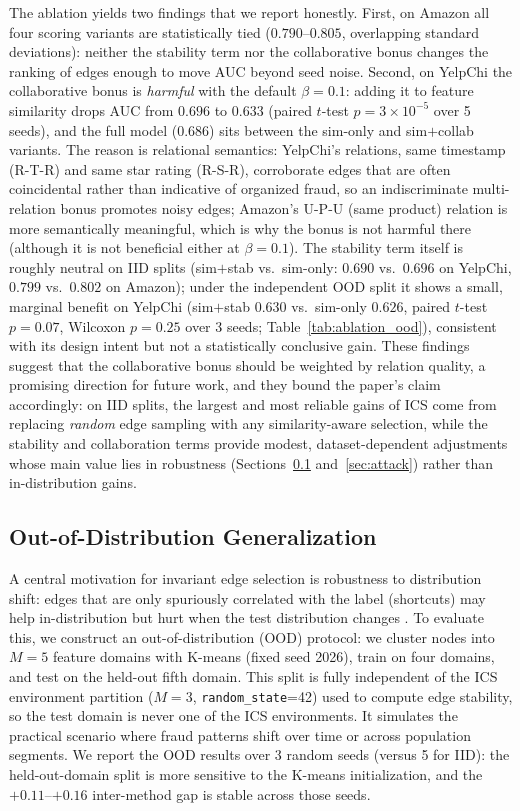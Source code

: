 \documentclass[11pt]{article}
\begin{document}
The ablation yields two findings that we report honestly. First, on Amazon all four scoring variants are statistically tied ($0.790$--$0.805$, overlapping standard deviations): neither the stability term nor the collaborative bonus changes the ranking of edges enough to move AUC beyond seed noise. Second, on YelpChi the collaborative bonus is \emph{harmful} with the default $\beta=0.1$: adding it to feature similarity drops AUC from $0.696$ to $0.633$ (paired $t$-test $p=3\times10^{-5}$ over 5 seeds), and the full model ($0.686$) sits between the sim-only and sim$+$collab variants. The reason is relational semantics: YelpChi's relations, same timestamp (R-T-R) and same star rating (R-S-R), corroborate edges that are often coincidental rather than indicative of organized fraud, so an indiscriminate multi-relation bonus promotes noisy edges; Amazon's U-P-U (same product) relation is more semantically meaningful, which is why the bonus is not harmful there (although it is not beneficial either at $\beta=0.1$). The stability term itself is roughly neutral on IID splits (sim$+$stab vs.\ sim-only: $0.690$ vs.\ $0.696$ on YelpChi, $0.799$ vs.\ $0.802$ on Amazon); under the independent OOD split it shows a small, marginal benefit on YelpChi (sim$+$stab $0.630$ vs.\ sim-only $0.626$, paired $t$-test $p=0.07$, Wilcoxon $p=0.25$ over 3 seeds; Table~\ref{tab:ablation_ood}), consistent with its design intent but not a statistically conclusive gain. These findings suggest that the collaborative bonus should be weighted by relation quality, a promising direction for future work, and they bound the paper's claim accordingly: on IID splits, the largest and most reliable gains of ICS come from replacing \emph{random} edge sampling with any similarity-aware selection, while the stability and collaboration terms provide modest, dataset-dependent adjustments whose main value lies in robustness (Sections~\ref{sec:ood} and~\ref{sec:attack}) rather than in-distribution gains.

\subsection{Out-of-Distribution Generalization}\label{sec:ood}

A central motivation for invariant edge selection is robustness to distribution shift: edges that are only spuriously correlated with the label (shortcuts) may help in-distribution but hurt when the test distribution changes \cite{younesian2026xigl}. To evaluate this, we construct an out-of-distribution (OOD) protocol: we cluster nodes into $M{=}5$ feature domains with K-means (fixed seed 2026), train on four domains, and test on the held-out fifth domain. This split is fully independent of the ICS environment partition ($M{=}3$, \texttt{random\_state}=42) used to compute edge stability, so the test domain is never one of the ICS environments. It simulates the practical scenario where fraud patterns shift over time or across population segments. We report the OOD results over 3 random seeds (versus 5 for IID): the held-out-domain split is more sensitive to the K-means initialization, and the $+0.11$--$+0.16$ inter-method gap is stable across those seeds.
\end{document}
